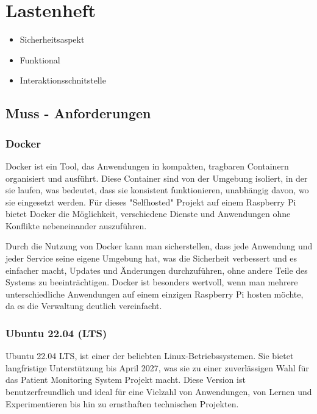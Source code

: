 
\section{Lastenheft}
\begin{itemize}
    \item Sicherheitsaspekt
    \item Funktional 
    \item Interaktionsschnitstelle
\end{itemize}

\subsection{Muss - Anforderungen}

\subsubsection{Docker}
Docker ist ein Tool, das Anwendungen in kompakten, tragbaren Containern organisiert und ausführt. Diese Container sind von der Umgebung isoliert, in der sie laufen, was bedeutet, dass sie konsistent funktionieren, unabhängig davon, wo sie eingesetzt werden. Für dieses "Selfhosted" Projekt auf einem Raspberry Pi bietet Docker die Möglichkeit, verschiedene Dienste und Anwendungen ohne Konflikte nebeneinander auszuführen.

Durch die Nutzung von Docker kann man sicherstellen, dass jede Anwendung und jeder Service seine eigene Umgebung hat, was die Sicherheit verbessert und es einfacher macht, Updates und Änderungen durchzuführen, ohne andere Teile des Systems zu beeinträchtigen. Docker ist besonders wertvoll, wenn man mehrere unterschiedliche Anwendungen auf einem einzigen Raspberry Pi hosten möchte, da es die Verwaltung deutlich vereinfacht.\cite{Docker}

\subsubsection{Ubuntu 22.04 (LTS)}
Ubuntu 22.04 LTS, ist einer der beliebten Linux-Betriebssystemen. Sie bietet langfristige Unterstützung bis April 2027, was sie zu einer zuverlässigen Wahl für das Patient Monitoring System Projekt macht. Diese Version ist benutzerfreundlich und ideal für eine Vielzahl von Anwendungen, von Lernen und Experimentieren bis hin zu ernsthaften technischen Projekten. \cite{ubuntu}

